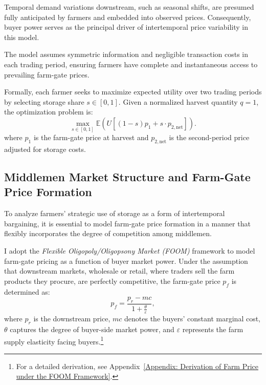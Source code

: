 Temporal demand variations downstream, such as seasonal shifts, are presumed fully anticipated by farmers and embedded into observed prices. Consequently, buyer power serves as the principal driver of intertemporal price variability in this model.

The model assumes symmetric information and negligible transaction costs in each trading period, ensuring farmers have complete and instantaneous access to prevailing farm-gate prices.

Formally, each farmer seeks to maximize expected utility over two trading periods by selecting storage share $s \in [0,1]$. Given a normalized harvest quantity $q = 1$, the optimization problem is:
\begin{equation}
\label{eq:starting objective}
\max_{s \in [0,1]} \mathbb{E} \left(U\left[ (1 - s) p_1 + s \cdot p_{2,\text{net}} \right]\right).
\end{equation}
where $p_1$ is the farm-gate price at harvest and $p_{2,\text{net}}$ is the second-period price adjusted for storage costs.



\subsection{Middlemen Market Structure and Farm-Gate Price Formation} \label{Section: Middlemen Market Structure and Farm-Gate Price Formation}
\noindent To analyze farmers’ strategic use of storage as a form of intertemporal bargaining, it is essential to model farm-gate price formation in a manner that flexibly incorporates the degree of competition among middlemen.

I adopt the \textit{Flexible Oligopoly/Oligopsony Market (FOOM)} framework to model farm-gate pricing as a function of buyer market power. Under the assumption that downstream markets, wholesale or retail, where traders sell the farm products they procure, are perfectly competitive, the farm-gate price $p_f$ is determined as:
\begin{equation}
p_f = \frac{p_r - mc}{1 + \frac{\theta}{\varepsilon}},
\end{equation}
where $p_r$ is the downstream price, $mc$ denotes the buyers’ constant marginal cost, $\theta$ captures the degree of buyer-side market power, and $\varepsilon$ represents the farm supply elasticity facing buyers.\footnote{For a detailed derivation, see Appendix~\ref{Appendix: Derivation of Farm Price under the FOOM Framework}.}


